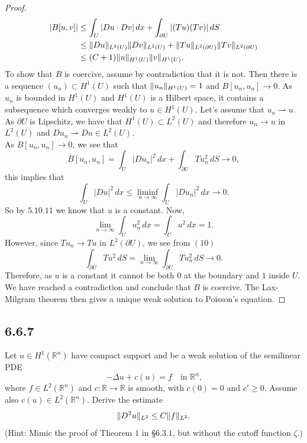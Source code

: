 \documentclass{article}
\DeclarePairedDelimiter{\norm}{\lVert}{\rVert}
\begin{document}
\begin{flushleft}
\begin{proof}
\begin{align*}
    |B[u,v]| &\le \int_U |Du\cdot Dv| \, dx + \int_{\partial U}|(Tu)(Tv)|\,dS \\&\le
    \norm{Du}_{L^2(U)}\norm{Dv}_{L^2(U)} +  \norm{Tu}_{L^2(\partial U)} \norm{Tv}_{L^2(\partial U)} \\&\le
    (C+1)\norm{u}_{H^1(U)} \norm{v}_{H^1(U)}.
\end{align*}
To show that $B$ is coercive, assume by contradiction that it is not. Then there is a sequence $(u_n)\subset H^1(U)$ such that $\norm{u_n}_{H^1(U)}=1$ and $B[u_n,u_n]\to 0$. As $u_n$ is bounded in $H^1(U)$ and $H^1(U)$ is a Hilbert space, it contains a subsequence which converges weakly to $u\in H^1(U)$. Let's assume that $u_n \rightharpoonup u$. As $\partial U$ is Lipschitz, we have that $H^1(U) \subset L^2(U)$ and therefore $u_n\to u$ in $L^2(U)$ and $Du_n \rightharpoonup Du \in L^2(U)$.  
\\
\bigskip
As $B[u_n,u_n]\to 0$, we see that
\begin{equation}
 B[u_n,u_n] = \int_U |Du_n|^2\,dx +\int_{\partial U} Tu_n^2\,dS \to 0,   
\end{equation}
this implies that
$$\int_U |Du|^2\,dx \le \liminf_{n\to\infty} \int_U |Du_n|^2\, dx \to 0.$$
So by $5.10.11$ we know that $u$ is a constant. Now,
$$\lim_{n\to\infty}\int_U u_n^2 \,dx = \int_U u^2 \,dx=1.$$
However, since $Tu_n\to Tu$ in $L^2(\partial U)$, we see from $(10)$
$$\int_{\partial U} Tu^2 \,dS = \lim_{n\to\infty}\int_{\partial U} Tu_n^2\, dS \to 0 .$$
Therefore, as $u$ is a constant it cannot be both $0$ at the boundary and $1$ inside $U$. We have reached a contradiction and conclude that $B$ is coercive. The Lax-Milgram theorem then gives a unique weak solution to Poisson's equation.
\end{proof}
\subsection{\textbf{6.6.7}} Let $u\in H^1(\mathbb R^n)$ have compact support and be a weak solution of the semilinear PDE
$$-\Delta u + c(u)=f\quad \text{in $\mathbb R^n$,}$$
where $f\in L^2(\mathbb R^n)$ and $c:\mathbb R \to \mathbb R$ is smooth, with $c(0)=0$ and $c'\ge 0$. Assume also $c(u)\in L^2(\mathbb R^n)$. Derive the estimate
$$\norm{D^2u}_{L^2} \le C\norm{f}_{L^2}.$$
(Hint: Mimic the proof of Theorem $1$ in §$6.3.1$, but without the cutoff function $\zeta$.)


\end{flushleft}
\end{document}
